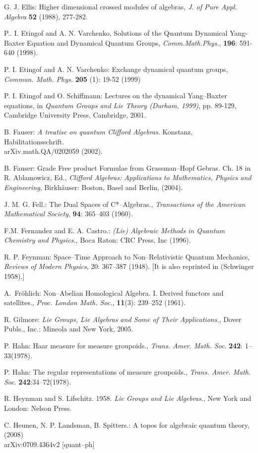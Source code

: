 \documentclass[12pt]{article}
\theoremstyle{plain}
\theoremstyle{definition}
\numberwithin{equation}{section}
\begin{document}
\begin{thebibliography}{9}
G. J. Ellis: Higher dimensional crossed modules of algebras,
\emph{J. of Pure Appl. Algebra} \textbf{52} (1988), 277-282.

P.. I. Etingof and A. N. Varchenko, Solutions of the Quantum Dynamical Yang-Baxter Equation and Dynamical Quantum Groups, \emph{Comm.Math.Phys.}, \textbf{196}: 591-640 (1998).

P. I. Etingof and A. N. Varchenko: Exchange dynamical quantum
groups, \emph{Commun. Math. Phys.} \textbf{205} (1): 19-52 (1999)

P. I. Etingof and O. Schiffmann: Lectures on the dynamical Yang--Baxter equations, in \emph{Quantum Groups and Lie Theory (Durham, 1999)}, pp. 89-129, Cambridge University Press, Cambridge, 2001.

B. Fauser: \emph{A treatise on quantum Clifford Algebras}. Konstanz,
Habilitationsschrift. \\ arXiv.math.QA/0202059 (2002).

B. Fauser: Grade Free product Formulae from Grassman--Hopf Gebras.
Ch. 18 in R. Ablamowicz, Ed., \emph{Clifford Algebras: Applications to Mathematics, Physics and Engineering}, Birkh\"{a}user: Boston, Basel and Berlin, (2004).

J. M. G. Fell.: The Dual Spaces of  C*--Algebras., \emph{Transactions of the American
Mathematical Society}, \textbf{94}: 365--403 (1960).

F.M. Fernandez and E. A. Castro.:  \emph{(Lie) Algebraic Methods in Quantum Chemistry and Physics.}, Boca Raton: CRC Press, Inc  (1996).

 R. P. Feynman: Space--Time Approach to Non--Relativistic Quantum Mechanics, {\em Reviews 
of Modern Physics}, 20: 367--387 (1948). [It is also reprinted in (Schwinger 1958).]

A.~Fr{\"o}hlich: Non--Abelian Homological Algebra. {I}.
{D}erived functors and satellites.\/, \emph{Proc. London Math. Soc.}, \textbf{11}(3): 239--252 (1961).

R. Gilmore: \emph{Lie Groups, Lie Algebras and Some of Their Applications.},
Dover Publs., Inc.: Mineola and New York, 2005.

P. Hahn: Haar measure for measure groupoids., \textit{Trans. Amer. Math. Soc}. \textbf{242}: 1--33(1978).

P. Hahn: The regular representations of measure groupoids., \textit{Trans. Amer. Math. Soc}. \textbf{242}:34--72(1978).

R. Heynman and S. Lifschitz. 1958. \emph{Lie Groups and Lie Algebras}., New York and London: Nelson Press.

C. Heunen, N. P. Landsman, B. Spitters.: A topos for algebraic quantum theory, (2008)   \\ 
arXiv:0709.4364v2 [quant--ph]

\end{thebibliography}
\end{document}
